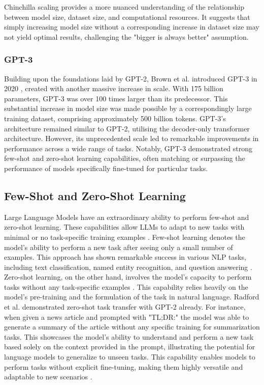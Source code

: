 \documentclass[a4paper, oneside]{discothesis}
\begin{document}
Chinchilla scaling provides a more nuanced understanding of the relationship between model size, dataset size, and computational resources. It suggests that simply increasing model size without a corresponding increase in dataset size may not yield optimal results, challenging the "bigger is always better" assumption.

\subsubsection{GPT-3}
Building upon the foundations laid by GPT-2, Brown et al. introduced GPT-3 in 2020 \cite{brown2020language}, created with another massive increase in scale. With 175 billion parameters, GPT-3 was over 100 times larger than its predecessor. 
This substantial increase in model size was made possible by a correspondingly large training dataset, comprising approximately 500 billion tokens.
GPT-3's architecture remained similar to GPT-2, utilising the decoder-only transformer architecture. 
However, its unprecedented scale led to remarkable improvements in performance across a wide range of tasks. Notably, GPT-3 demonstrated strong few-shot and zero-shot learning capabilities, often matching or surpassing the performance of models specifically fine-tuned for particular tasks.

\subsection{Few-Shot and Zero-Shot Learning}
Large Language Models have an extraordinary ability to perform few-shot and zero-shot learning. These capabilities allow LLMs to adapt to new tasks with minimal or no task-specific training examples \cite{brown2020language}.
Few-shot learning denotes the model's ability to perform a new task after seeing only a small number of examples. This approach has shown remarkable success in various NLP tasks, including text classification, named entity recognition, and question answering \cite{lin2022fewshotlearningmultilinguallanguage}. 
Zero-shot learning, on the other hand, involves the model's capacity to perform tasks without any task-specific examples \cite{xian2018zero}. 
This capability relies heavily on the model's pre-training and the formulation of the task in natural language. 
Radford et al. \cite{radford2019language} demonstrated zero-shot task transfer with GPT-2 already. For instance, when given a news article and prompted with "TL;DR:" the model was able to generate a summary of the article without any specific training for summarization tasks. This showcases the model's ability to understand and perform a new task based solely on the context provided in the prompt, illustrating the potential for language models to generalize to unseen tasks. This capability enables models to perform tasks without explicit fine-tuning, making them highly versatile and adaptable to new scenarios \cite{min2024rethinking}.
\end{document}
